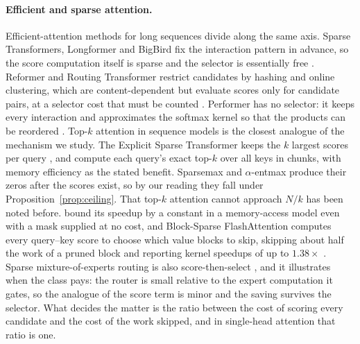 \paragraph{Efficient and sparse attention.} Efficient-attention methods for long
sequences divide along the same axis. Sparse Transformers, Longformer and
BigBird fix the interaction pattern in advance, so the score computation itself
is sparse and the selector is essentially free
\citep{child2019sparse,beltagy2020longformer,zaheer2020bigbird}. Reformer and
Routing Transformer restrict candidates by hashing and online clustering, which
are content-dependent but evaluate scores only for candidate pairs, at a
selector cost that must be counted \citep{kitaev2020reformer,roy2021routing}.
Performer has no selector: it keeps every interaction and approximates the
softmax kernel so that the products can be reordered
\citep{choromanski2021performers}. Top-$k$ attention in sequence models is the
closest analogue of the mechanism we study. The Explicit Sparse Transformer
keeps the $k$ largest scores per query \citep{zhao2019explicit}, and
\citet{gupta2021topk} compute each query's exact top-$k$ over all keys in
chunks, with memory efficiency as the stated benefit. Sparsemax and
$\alpha$-entmax \citep{martins2016sparsemax,peters2019entmax} produce their
zeros after the scores exist, so by our reading they fall under
Proposition~\ref{prop:ceiling}. That top-$k$ attention cannot approach $N/k$ has
been noted before. \citet{chen2023dfss} bound its speedup by a constant in a
memory-access model even with a mask supplied at no cost, and Block-Sparse
FlashAttention computes every query--key score to choose which value blocks to
skip, skipping about half the work of a pruned block and reporting kernel
speedups of up to $1.38\times$ \citep{ohayon2026bsfa}. Sparse mixture-of-experts
routing is also score-then-select \citep{shazeer2017moe,fedus2022switch}, and it
illustrates when the class pays: the router is small relative to the expert
computation it gates, so the analogue of the score term is minor and the saving
survives the selector. What decides the matter is the ratio between the cost of
scoring every candidate and the cost of the work skipped, and in single-head
attention that ratio is one.

